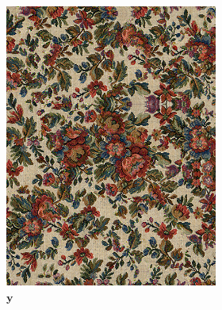 \begin{figure}[]
    \centering    
    \begin{subfigure}{\textwidth}
        \centering
        \begin{subfigure}{0.24\textwidth}
            \centering
            \includegraphics[width=\textwidth]{images/04-experiment02/human/flowers/target.jpg}
            \caption*{\(\bm{y}\)}
        \end{subfigure}
        \hfill
        \begin{subfigure}{0.24\textwidth}
            \centering

\end{subfigure}
\end{subfigure}
\end{figure}
